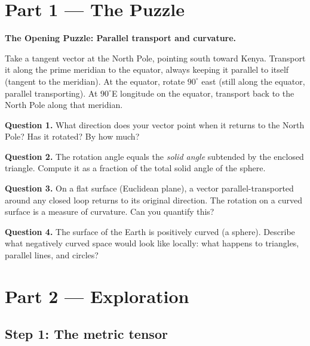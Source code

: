 \documentclass[12pt,a4paper]{article}
\begin{document}
\newpage

\section{Part 1 \texorpdfstring{---}{--} The Puzzle}

\begin{puzzlebox}
\textbf{The Opening Puzzle: Parallel transport and curvature.}

Take a tangent vector at the North Pole, pointing south toward Kenya. Transport it along the prime meridian to the equator, always keeping it parallel to itself (tangent to the meridian). At the equator, rotate $90^\circ$ east (still along the equator, parallel transporting). At $90^\circ$E longitude on the equator, transport back to the North Pole along that meridian.

\medskip
\textbf{Question 1.} What direction does your vector point when it returns to the North Pole? Has it rotated? By how much?

\textbf{Question 2.} The rotation angle equals the \emph{solid angle} subtended by the enclosed triangle. Compute it as a fraction of the total solid angle of the sphere.

\textbf{Question 3.} On a flat surface (Euclidean plane), a vector parallel-transported around any closed loop returns to its original direction. The rotation on a curved surface is a measure of curvature. Can you quantify this?

\textbf{Question 4.} The surface of the Earth is positively curved (a sphere). Describe what negatively curved space would look like locally: what happens to triangles, parallel lines, and circles?
\end{puzzlebox}

\section{Part 2 \texorpdfstring{---}{--} Exploration}

\subsection{Step 1: The metric tensor}
\end{document}
